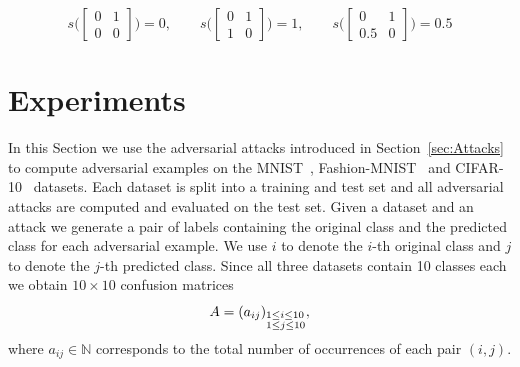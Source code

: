 \documentclass{article}
\begin{document}
\begin{equation*}
	s\bigg(\begin{bmatrix}
		0 & 1 \\
		0 & 0
	\end{bmatrix}\bigg) = 0, \qquad
%
	s\bigg(\begin{bmatrix}
		0 & 1 \\
		1 & 0
	\end{bmatrix}\bigg) = 1, \qquad
%
	s\bigg( \begin{bmatrix}
		0 & 1 \\
		0.5 & 0
	\end{bmatrix}\bigg) = 0.5
\end{equation*}
%
%



\section{Experiments}\label{experiments}
In this Section we use the adversarial attacks introduced in Section~\ref{sec:Attacks} to compute adversarial examples on the MNIST~\cite{deng2012mnist}, Fashion-MNIST~\cite{deng2012mnist} and CIFAR-10~\cite{krizhevsky2009learning} datasets. Each dataset is split into a training and test set and all adversarial attacks are computed and evaluated on the test set. Given a dataset and an attack we generate a pair of labels containing the original class and the predicted class for each adversarial example. We use $i$ to denote the $i$-th original class and $j$ to denote the $j$-th predicted class. Since all three datasets contain 10 classes each we obtain $10\times10$ confusion matrices
\[A=(a_{ij})_{\begin{subarray}{l} 1\le i\le 10 \\ 1\le j\le 10\end{subarray}},\]
where $a_{ij}\in\mathbb{N}$ corresponds to the total number of occurrences of each pair $(i,j)$.
\end{document}
